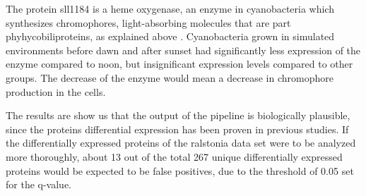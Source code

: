 The protein sll1184 is a heme oxygenase, an enzyme in cyanobacteria which synthesizes chromophores, light-absorbing molecules that are part phyhycobiliproteins, as explained above \cite{heme-oxygenase} \cite{heme-oxygenase-2}. Cyanobacteria grown in simulated environments before dawn and after sunset had significantly less expression of the enzyme compared to noon, but insignificant expression levels compared to other groups. The decrease of the enzyme would mean a decrease in chromophore production in the cells.

The results are show us that the output of the pipeline is biologically plausible, since the proteins differential expression has been proven in previous studies. If the differentially expressed proteins of the ralstonia data set were to be analyzed more thoroughly, about 13 out of the total 267 unique  differentially expressed proteins would be expected to be false positives, due to the threshold of 0.05 set for the q-value.
